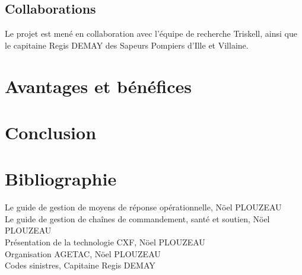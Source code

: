 \documentclass{article}
\begin{document}
\subsection{Collaborations}
Le projet est mené en collaboration avec l’équipe de recherche Triskell, ainsi que le capitaine Regis DEMAY des Sapeurs Pompiers d’Ille et Villaine.
\section{Avantages et bénéfices}
\section*{Conclusion}
\section*{Bibliographie}
Le guide de gestion de moyens de réponse opérationnelle, Nöel  PLOUZEAU\\
Le guide de gestion de chaînes de commandement, santé et soutien, Nöel  PLOUZEAU\\
Présentation de la technologie CXF, Nöel PLOUZEAU\\
Organisation AGETAC, Nöel  PLOUZEAU\\
Codes sinistres, Capitaine Regis DEMAY\\
\end{document}
